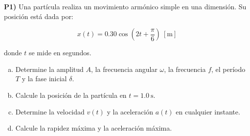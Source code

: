 \textbf{P1)} Una partícula realiza un movimiento armónico simple en una dimensión. Su posición está dada por:

\[
x(t) = 0.30\cos\left(2t + \frac{\pi}{6}\right)\ [\mathrm{m}]
\]

donde $t$ se mide en segundos.

\begin{enumerate}[a)]
  \item Determine la amplitud $A$, la frecuencia angular $\omega$, la frecuencia $f$, el período $T$ y la fase inicial $\delta$.
  \item Calcule la posición de la partícula en $t = 1.0\ \mathrm{s}$.
  \item Determine la velocidad $v(t)$ y la aceleración $a(t)$ en cualquier instante.
  \item Calcule la rapidez máxima y la aceleración máxima.
\end{enumerate}

\vspace{0.3cm}